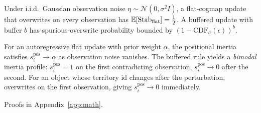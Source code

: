 \begin{proposition}[Stability]\label{prop:stab}
Under i.i.d.\ Gaussian observation noise $\eta\sim\mathcal{N}(0,\sigma^2 I)$,
a flat-cogmap update that overwrites on every observation has
$\mathbb{E}[\mathrm{Stab}_{\mathrm{flat}}] = \tfrac12$. A buffered \tb update with
buffer $b$ has spurious-overwrite probability bounded by
$(1-\mathrm{CDF}_\sigma(\epsilon))^b$.
\end{proposition}

\begin{proposition}\label{prop:inertia}
For an autoregressive flat update with prior weight $\alpha$, the \tos
positional inertia satisfies $s_i^{\mathrm{pos}} \to \alpha$ as
observation noise vanishes. The buffered \tb rule yields a
\emph{bimodal} inertia profile: $s_i^{\mathrm{pos}}{=}1$ on the first
contradicting observation, $s_i^{\mathrm{pos}}{\to}0$ after the second.
For an object whose territory id changes after the perturbation,
\tb overwrites on the first observation, giving $s_i^{\mathrm{pos}}{\to}0$
immediately.
\end{proposition}

Proofs in Appendix~\ref{app:math}.
